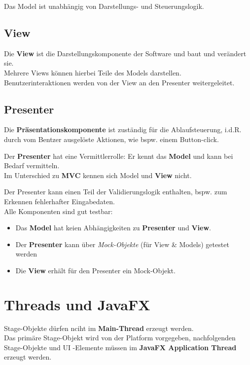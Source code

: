 Das Model ist unabhängig von Darstellungs- und Steuerungslogik.

\subsection*{View}

Die \textbf{View} ist die Darstellungskomponente der Software und baut und verändert sie.\\
Mehrere Views können hierbei Teile des Models darstellen.\\
Benutzerinteraktionen werden von der View an den Presenter weitergeleitet.\\

\subsection*{Presenter}
Die \textbf{Präsentationskomponente} ist zuständig für die Ablaufsteuerung, i.d.R. durch vom Bentzer ausgelöste Aktionen, wie bspw. einem Button-click.

\begin{tcolorbox}
Der \textbf{Presenter} hat eine Vermittlerrolle: Er kennt das \textbf{Model} und kann bei Bedarf vermitteln.\\
Im Unterschied zu \textbf{MVC} kennen sich Model und \textbf{View} nicht.\\
\end{tcolorbox}

Der Presenter kann einen Teil der Validierungslogik enthalten, bspw. zum Erkennen fehlerhafter Eingabedaten.\\

\noindent
Alle Komponenten sind gut testbar:

\begin{itemize}
    \item Das \textbf{Model} hat keien Abhängigkeiten zu \textbf{Presenter} und \textbf{View}.
    \item Der \textbf{Presenter} kann über \textit{Mock-Objekte} (für View & Models) getestet werden
    \item Die \textbf{View} erhält für den Presenter ein Mock-Objekt.
\end{itemize}

\section{Threads und JavaFX}

Stage-Objekte dürfen nciht im \textbf{Main-Thread} erzeugt werden. \\
Das primäre Stage-Objekt wird von der Platform vorgegeben, nachfolgenden Stage-Objekte und UI -Elemente müssen im \textbf{JavaFX Application Thread} erzeugt werden.\\

